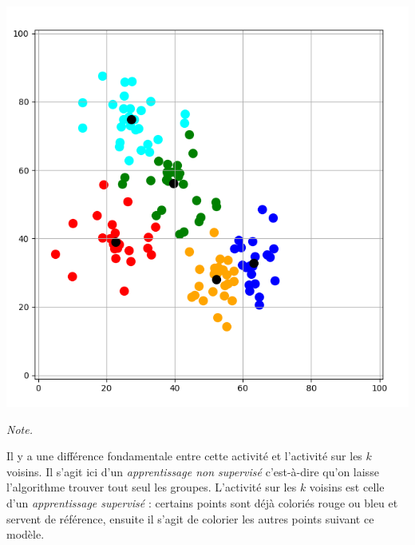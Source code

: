 \documentclass[11pt,class=report,crop=false]{standalone}
\begin{document}
\begin{activite}[Barycentres]
\begin{center}
	\includegraphics[scale=\myscale,scale=0.22]{ecran_barycentres_exemple_bis_05}
\end{center}

\bigskip



\emph{Note.} 

Il y a une différence fondamentale entre cette activité et l'activité sur les  $k$ voisins. Il s'agit ici d'un \emph{apprentissage non supervisé} c'est-à-dire qu'on laisse l'algorithme trouver tout seul les groupes. L'activité sur les $k$ voisins est celle d'un \emph{apprentissage supervisé} : certains points sont déjà coloriés rouge ou bleu et servent de référence, ensuite il s'agit de colorier les autres points suivant ce modèle.


\end{activite}


\bigskip


%
%
%	
%
%
%
\end{document}
